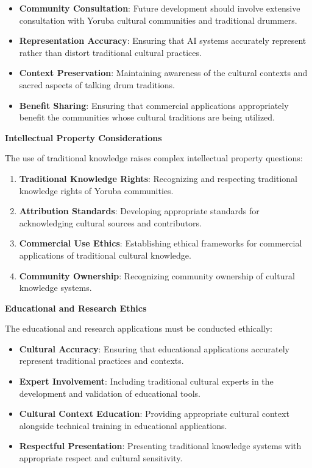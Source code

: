 \documentclass[12pt,a4paper]{article}
\begin{document}
\begin{itemize}
\item \textbf{Community Consultation}: Future development should involve extensive consultation with Yoruba cultural communities and traditional drummers.
\item \textbf{Representation Accuracy}: Ensuring that AI systems accurately represent rather than distort traditional cultural practices.
\item \textbf{Context Preservation}: Maintaining awareness of the cultural contexts and sacred aspects of talking drum traditions.
\item \textbf{Benefit Sharing}: Ensuring that commercial applications appropriately benefit the communities whose cultural traditions are being utilized.
\end{itemize}

\textbf{Intellectual Property Considerations}

The use of traditional knowledge raises complex intellectual property questions:

\begin{enumerate}
\item \textbf{Traditional Knowledge Rights}: Recognizing and respecting traditional knowledge rights of Yoruba communities.
\item \textbf{Attribution Standards}: Developing appropriate standards for acknowledging cultural sources and contributors.
\item \textbf{Commercial Use Ethics}: Establishing ethical frameworks for commercial applications of traditional cultural knowledge.
\item \textbf{Community Ownership}: Recognizing community ownership of cultural knowledge systems.
\end{enumerate}

\textbf{Educational and Research Ethics}

The educational and research applications must be conducted ethically:

\begin{itemize}
\item \textbf{Cultural Accuracy}: Ensuring that educational applications accurately represent traditional practices and contexts.
\item \textbf{Expert Involvement}: Including traditional cultural experts in the development and validation of educational tools.
\item \textbf{Cultural Context Education}: Providing appropriate cultural context alongside technical training in educational applications.
\item \textbf{Respectful Presentation}: Presenting traditional knowledge systems with appropriate respect and cultural sensitivity.
\end{itemize}
\end{document}
